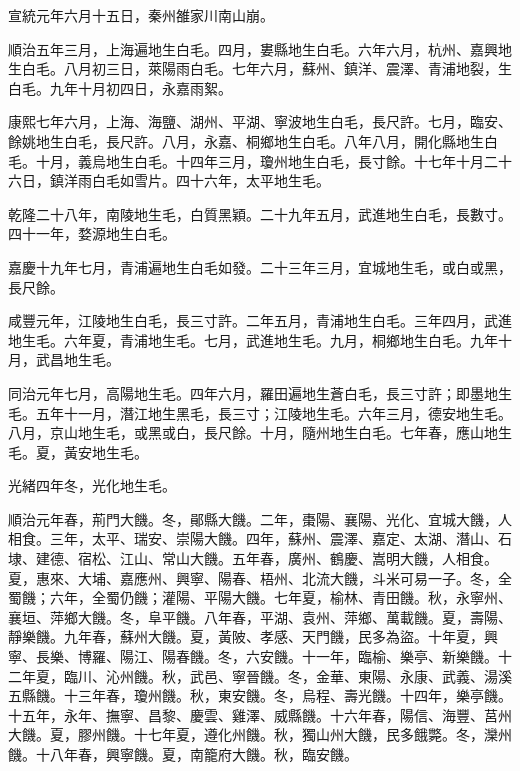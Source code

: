 \begin{pinyinscope}
宣統元年六月十五日，秦州雒家川南山崩。

順治五年三月，上海遍地生白毛。四月，婁縣地生白毛。六年六月，杭州、嘉興地生白毛。八月初三日，萊陽雨白毛。七年六月，蘇州、鎮洋、震澤、青浦地裂，生白毛。九年十月初四日，永嘉雨絮。

康熙七年六月，上海、海鹽、湖州、平湖、寧波地生白毛，長尺許。七月，臨安、餘姚地生白毛，長尺許。八月，永嘉、桐鄉地生白毛。八年八月，開化縣地生白毛。十月，義烏地生白毛。十四年三月，瓊州地生白毛，長寸餘。十七年十月二十六日，鎮洋雨白毛如雪片。四十六年，太平地生毛。

乾隆二十八年，南陵地生毛，白質黑穎。二十九年五月，武進地生白毛，長數寸。四十一年，婺源地生白毛。

嘉慶十九年七月，青浦遍地生白毛如發。二十三年三月，宜城地生毛，或白或黑，長尺餘。

咸豐元年，江陵地生白毛，長三寸許。二年五月，青浦地生白毛。三年四月，武進地生毛。六年夏，青浦地生毛。七月，武進地生毛。九月，桐鄉地生白毛。九年十月，武昌地生毛。

同治元年七月，高陽地生毛。四年六月，羅田遍地生蒼白毛，長三寸許；即墨地生毛。五年十一月，潛江地生黑毛，長三寸；江陵地生毛。六年三月，德安地生毛。八月，京山地生毛，或黑或白，長尺餘。十月，隨州地生白毛。七年春，應山地生毛。夏，黃安地生毛。

光緒四年冬，光化地生毛。

順治元年春，荊門大饑。冬，鄖縣大饑。二年，棗陽、襄陽、光化、宜城大饑，人相食。三年，太平、瑞安、崇陽大饑。四年，蘇州、震澤、嘉定、太湖、潛山、石埭、建德、宿松、江山、常山大饑。五年春，廣州、鶴慶、嵩明大饑，人相食。夏，惠來、大埔、嘉應州、興寧、陽春、梧州、北流大饑，斗米可易一子。冬，全蜀饑；六年，全蜀仍饑；灌陽、平陽大饑。七年夏，榆林、青田饑。秋，永寧州、襄垣、萍鄉大饑。冬，阜平饑。八年春，平湖、袁州、萍鄉、萬載饑。夏，壽陽、靜樂饑。九年春，蘇州大饑。夏，黃陂、孝感、天門饑，民多為盜。十年夏，興寧、長樂、博羅、陽江、陽春饑。冬，六安饑。十一年，臨榆、樂亭、新樂饑。十二年夏，臨川、沁州饑。秋，武邑、寧晉饑。冬，金華、東陽、永康、武義、湯溪五縣饑。十三年春，瓊州饑。秋，東安饑。冬，烏程、壽光饑。十四年，樂亭饑。十五年，永年、撫寧、昌黎、慶雲、雞澤、威縣饑。十六年春，陽信、海豐、莒州大饑。夏，膠州饑。十七年夏，遵化州饑。秋，獨山州大饑，民多餓斃。冬，灤州饑。十八年春，興寧饑。夏，南籠府大饑。秋，臨安饑。


\end{pinyinscope}
